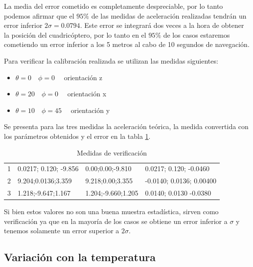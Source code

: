 \documentclass[spanish,12pt,a4paper,titlepage]{report}
\begin{document}
La media del error cometido es completamente despreciable, por lo tanto podemos afirmar que el $95\% $ de las medidas de aceleración realizadas tendrán un error inferior $2\sigma=0.0794$. Este error se integrará dos veces a la hora de obtener la posición del cuadricóptero, por lo tanto en el $95 \%$ de los casos estaremos cometiendo un error inferior a los 5 metros al cabo de 10 segundos de navegación. 
 
Para verificar la calibración realizada se utilizan las medidas siguientes:
\begin{itemize}
\item $\theta = 0 \quad \phi = 0 \quad$ orientación z
\item $\theta = 20 \quad \phi = 0 \quad$ orientación x
\item $\theta = 10 \quad \phi = 45 \quad$ orientación y
\end{itemize}

Se presenta para las tres medidas la aceleración teórica, la medida convertida con los parámetros obtenidos y el error en la tabla \ref{tab:diff}. 

\begin{table}[H]
\centering
\begin{tabular}{|p{90pt}|p{90pt}|p{90pt}|p{90pt}|}
\hline
\cellcolor[gray]{0.8}{Medida} & \cellcolor[gray]{0.8}{Aceleración Medida ($ms^{-2}$)}&\cellcolor[gray]{0.8}{Aceleración teórica($m^{-2}$)}& \cellcolor[gray]{0.8}{Error($ms^{-2}$)} \\
\hline
1 &  0.0217; 0.120; -9.856   & 0.00;0.00;-9.810     & 0.0217; 0.120; -0.0460\\
\hline
2 & 9.204;0.0136;3.359       & 9.218;0.00;3.355     & -0.0140; 0.0136; 0.00400\\
\hline
3 & 1.218;-9.647;1.167       & 1.204;-9.660;1.205   & 0.0140; 0.0130 -0.0380\\
\hline
\end{tabular}
\caption{Medidas de verificación}
\label{tab:diff}
\end{table}

Si bien estos valores no son una buena muestra estadística, sirven como verificación ya que en la mayoría de los casos se obtiene un error inferior a $\sigma$ y tenemos solamente un error superior a $2\sigma$.

\subsection{Variación con la temperatura}
\end{document}
